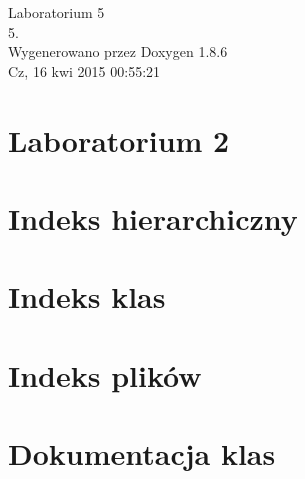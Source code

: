 \documentclass[twoside]{article}
\begin{document}
\hypersetup{pageanchor=false}
\begin{titlepage}
\vspace*{7cm}
\begin{center}%
{\Large Laboratorium 5 \\[1ex]\large 5. }\\
\vspace*{1cm}
{\large Wygenerowano przez Doxygen 1.8.6}\\
\vspace*{0.5cm}
{\small Cz, 16 kwi 2015 00:55:21}\\
\end{center}
\end{titlepage}
\tableofcontents
{}
\hypersetup{pageanchor=true}

\section{Laboratorium 2}
\label{index}\hypertarget{index}{}
\section{Indeks hierarchiczny}

\section{Indeks klas}

\section{Indeks plików}

\section{Dokumentacja klas}











\end{document}
